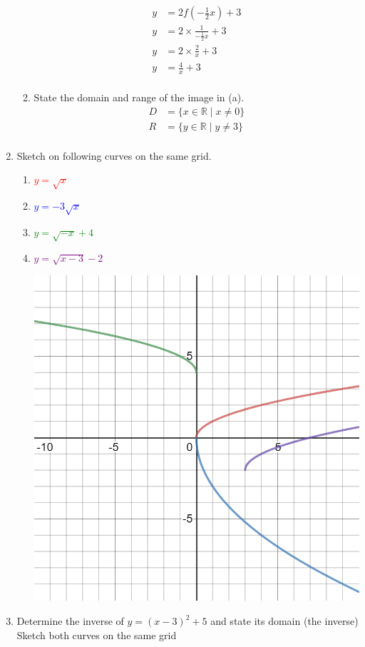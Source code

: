 \documentclass[paper=a4, fontsize=11pt]{scrartcl}
\begin{document}
\begin{enumerate}[resume]
\begin{enumerate}
        \begin{align*}
            y&=2f(-\frac{1}{2}x)+3\\
            y&=2\times\frac{1}{-\frac{1}{2}x}+3\\
            y&=2\times\frac{2}{x}+3\\
            y&=\frac{4}{x}+3\\
        \end{align*}
        \item State the domain and range of the image in (a).
        \begin{align*}
            D&=\{x\in\mathbb{R}\mid x\neq 0\}\\
            R&=\{y\in\mathbb{R}\mid y\neq 3\}\\
        \end{align*}
    \end{enumerate}
    \item Sketch on following curves on the same grid.
    \begin{enumerate}
        \item \textcolor{red}{$y=\sqrt{x}$}
        \item \textcolor{blue}{$y=-3\sqrt{x}$}
        \item \textcolor{green}{$y=\sqrt{-x}+4$}
        \item \textcolor{purple}{$y=\sqrt{x-3}-2$}
        
        \includegraphics[scale=0.2]{MathExamReview/36-graph.png}
    \end{enumerate}
    \item Determine the inverse of $y=(x-3)^2+5$ and state its domain (the inverse) Sketch both curves on the same grid
    

\end{enumerate}
\end{document}
